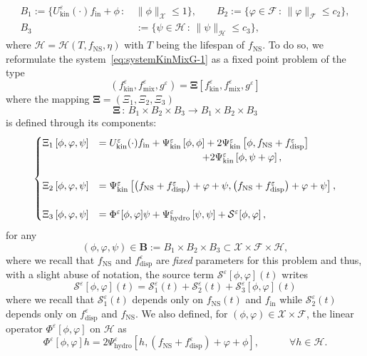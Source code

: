 \documentclass[10pt]{amsart}
\theoremstyle{definition}\newtheorem{defi}[theo]{Definition}\newtheorem{rema}[theo]{Remark}\newtheorem{exam}[theo]{Example}\newtheorem{exem}[theo]{Example}\newtheorem{nota}[theo]{Notation}
\newcommand{\ini}{\mathrm{in}}
\newcommand{\ns}{\mathrm{NS}}
\newcommand{\hyd}{\mathrm{hydro}}
\newcommand{\mix}{\mathrm{mix}}
\newcommand{\kin}{\mathrm{kin}}
\newcommand{\disp}{\mathrm{disp}}
\renewcommand{\SS}{\mathcal{S}}
\newcommand{\FFF}{\mathscr{F}}
\newcommand{\HHH}{\mathscr{H}}
\newcommand{\GGG}{\mathscr{X}}
\newcommand{\SSSs}{\HHH}
\newcommand{\SSSl}{\GGG}
\newcommand{\SSSm}{\FFF}
\renewcommand*\le{\leqslant}
\newcommand*\eps{{\varepsilon}}
\let\oldforall\forall
\renewcommand*{\forall}{\mathrel{\oldforall}}
\begin{document}
\begin{equation*}
\begin{split}
B_1 := \bigg\{ U^\eps_\kin(\cdot) f_\ini + \phi \, : \, &\| \phi \|_{\SSSl} \le 1 \bigg\}, \qquad B_2 := \bigg\{ \varphi \in \SSSm \, : \, \| \varphi \|_{\SSSm} \le c_2 \bigg\}, \\
B_3 &:= \bigg\{ \psi \in \SSSs \, : \, \| \psi \|_{\SSSs} \le c_3 \bigg\},
\end{split}
\end{equation*}
where $\SSSs=\SSSs(T, f_\ns, \eta)$ with $T$ being the lifespan of $f_\ns$. To do so, we reformulate the system~\eqref{eq:systemKinMixG-1} as a fixed point problem of the type
\[
\left(f^\eps_\kin, f^\eps_\mix, g^\eps\right)=\bm{\Xi}\left[f^\eps_\kin, f^\eps_\mix, g^\eps\right]
\]
where the mapping $\bm{\Xi}=(\Xi_1, \Xi_2, \Xi_3)$
\begin{equation*}
\bm{\Xi} \, : \, B_1\times B_2 \times B_3 \longrightarrow B_1\times B_2\times B_3
\end{equation*}
is defined through its components:
\begin{equation}\label{eq:systemXIi}
\begin{cases}
\Xi_1\left[\phi, \varphi, \psi \right] &= U^\eps_\kin(\cdot) f_\ini + \Psi^\eps_\kin\left[\phi, \phi\right] +2 \Psi^\eps_\kin\left[\phi, f_\ns + f^\eps_\disp\right]\\
&\mkern187mu + 2 \Psi^\eps_\kin\left[\phi, \psi + \varphi\right],\\ \\
\Xi_2\left[\phi, \varphi, \psi\right] &= \Psi^\eps_\kin\left[\left(f_\ns + f^\eps_\disp\right) + \varphi + \psi, \left(f_\ns + f^\eps_\disp\right) + \varphi + \psi \right],\\ \\
\Xi_3\left[\phi, \varphi, \psi\right] &= \Phi^\eps[\phi,\varphi]\psi + \Psi^\eps_\hyd\left[\psi, \psi\right] + \SS^\eps[\phi, \varphi]\,,
\end{cases}
\end{equation}
for any
\[
(\phi,\varphi,\psi) \in \bm{B} := B_1\times B_2 \times B_3 \subset \SSSl \times \SSSm \times \SSSs,
\]
where we recall that $f_\ns$ and $f_\disp^\eps$ are \emph{fixed} parameters for this problem and thus, with a slight abuse of notation, the source term $\SS^\eps[\phi,\varphi](t)$ writes
\[
\SS^\eps[\phi,\varphi](t)=\SS_1^\eps(t)+\SS^\eps_2(t)+\SS^\eps_3[\phi,\varphi](t)
\]
where we recall that $\SS_1^\eps(t)$ depends only on $f_\ns(t)$ and $f_\ini$ while $\SS_2^\eps(t)$ depends only on $f_\disp^\eps$ and $f_\ns$. We also defined, for $(\phi,\varphi) \in \SSSl \times \SSSm$, the linear operator $\Phi^\eps[\phi,\varphi]$ on $\SSSs$ as
\[
\Phi^\eps\left[\phi,\varphi\right]h=2\Psi_\hyd^\eps\left[h,\left(f_\ns+f_\disp^\eps\right)+\varphi+\phi\right], \qquad \quad \forall h\in \SSSs.
\]
\end{document}
